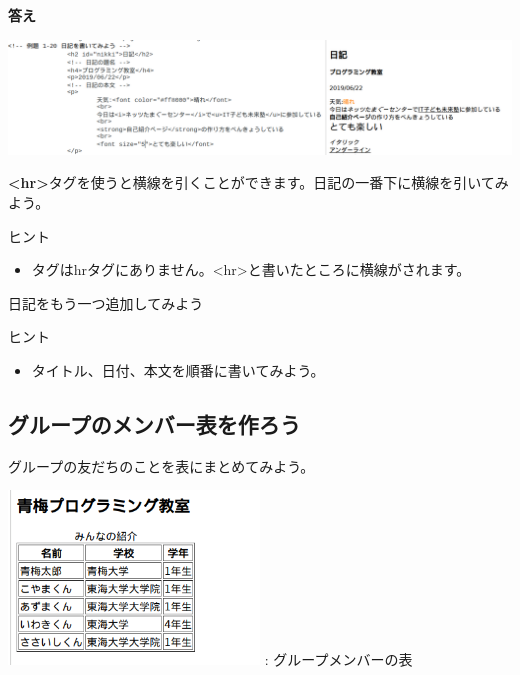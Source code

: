 \documentclass[a4paper,12pt]{jarticle}
\begin{document}
\clearpage
\textbf{答え}



\includegraphics[width=\textwidth]{textbook-img188.png}

\theQuestion\label{Q:hasAnswer04-8}
\textbf{{\textless}hr{\textgreater}}タグを使うと横線を引くことができます。日記の一番下に横線を引いてみよう。

ヒント

\begin{itemize}
  \item
        タグはhrタグにありません。{\textless}hr{\textgreater}と書いたところに横線がされます。
\end{itemize}
\theQuestion\label{Q:hasAnswer04-9}

日記をもう一つ追加してみよう

ヒント

\begin{itemize}
  \item
        タイトル、日付、本文を順番に書いてみよう。
\end{itemize}
\clearpage
{}
\subsection{\theExercise グループのメンバー表を作ろう}
グループの友だちのことを表にまとめてみよう。

\centering
\begin{minipage}{\textwidth}
  {\upshape
    \includegraphics[width=0.5\textwidth]{textbook-img189.png}
    \newline
    : グループメンバーの表}
\end{minipage}
\end{document}
